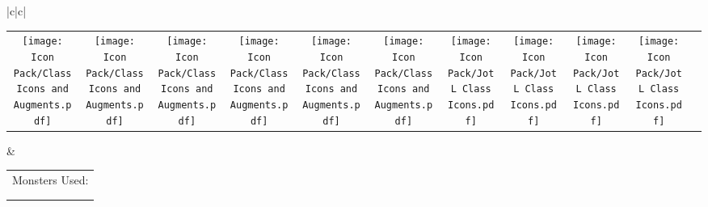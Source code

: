 \documentclass[13ex]{article}
\begin{document}
\begin{landscape}
\begin{center}
\begin{tabular}{|c|c|}
\begin{tabular}{c c c c c c c c c c c}
                \rule{0pt}{12pt}\texttt{[image: Icon Pack/Class Icons and Augments.pdf]}\underline{\hspace{1.25em}} & \texttt{[image: Icon Pack/Class Icons and Augments.pdf]}\underline{\hspace{1.25em}} & \texttt{[image: Icon Pack/Class Icons and Augments.pdf]}\underline{\hspace{1.25em}} & \texttt{[image: Icon Pack/Class Icons and Augments.pdf]}\underline{\hspace{1.25em}} & \texttt{[image: Icon Pack/Class Icons and Augments.pdf]}\underline{\hspace{1.25em}} & \texttt{[image: Icon Pack/Class Icons and Augments.pdf]}\underline{\hspace{1.25em}} & \texttt{[image: Icon Pack/JotL Class Icons.pdf]}\underline{\hspace{1.25em}}         & \texttt{[image: Icon Pack/JotL Class Icons.pdf]}\underline{\hspace{1.25em}}         & \texttt{[image: Icon Pack/JotL Class Icons.pdf]}\underline{\hspace{1.25em}}         & \texttt{[image: Icon Pack/JotL Class Icons.pdf]}\underline{\hspace{1.25em}}          &                                                                                                         \\
            \end{tabular} & \begin{tabular}{c c c c}
                                \multicolumn{4}{c}{Monsters Used:}                                                                                        \\
                                \rule{0pt}{15pt}\underline{\hspace{7em}} & \underline{\hspace{7em}} & \underline{\hspace{7em}} & \underline{\hspace{7em}} \\
                                \rule{0pt}{15pt}\underline{\hspace{7em}} & \underline{\hspace{7em}} & \underline{\hspace{7em}} &                          \\

\end{tabular}
\end{tabular}
\end{center}
\end{landscape}
\end{document}
